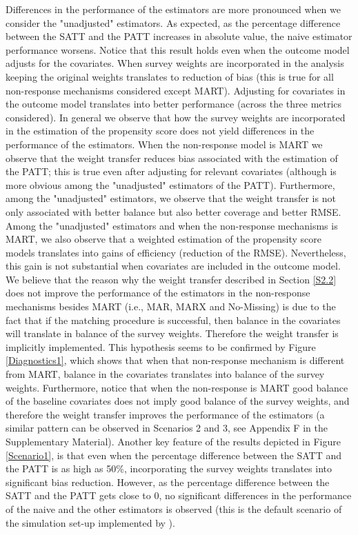 \documentclass[oupdraft]{bio}
\begin{document}
Differences in the performance of the estimators are more pronounced when we consider the "unadjusted" estimators. As expected, as the percentage difference between the SATT and the PATT increases in absolute value, the naive estimator performance worsens. Notice that this result holds even when the outcome model adjusts for the covariates. When survey weights are incorporated in the analysis keeping the original weights translates to reduction of bias (this is true for all non-response mechanisms considered except MART). Adjusting for covariates in the outcome model translates into better performance (across the three metrics considered). In general we observe that how the survey weights are incorporated in the estimation of the propensity score does not yield differences in the performance of the estimators. When the non-response model is MART we observe that the weight transfer reduces bias associated with the estimation of the PATT; this is true even after adjusting for relevant covariates (although is more obvious among the "unadjusted" estimators of the PATT). Furthermore, among the "unadjusted" estimators, we observe that the weight transfer is not only associated with better balance but also better coverage and better RMSE. Among the "unadjusted" estimators and when the non-response mechanisms is MART, we also observe that a weighted estimation of the propensity score models translates into gains of efficiency (reduction of the RMSE). Nevertheless, this gain is not substantial when covariates are included in the outcome model. We believe that the reason why the weight transfer described in Section \ref{S2.2} does not improve the performance of the estimators in the non-response mechanisms besides MART (i.e., MAR, MARX and No-Missing) is due to the fact that if the matching procedure is successful, then balance in the covariates will translate in balance of the survey weights. Therefore the weight transfer is implicitly implemented. This hypothesis seems to be confirmed by Figure \ref{Diagnostics1}, which shows that when that non-response mechanism is different from MART, balance in the covariates translates into balance of the survey weights. Furthermore, notice that when the non-response is MART good balance of the baseline covariates does not imply good balance of the survey weights, and therefore the weight transfer improves the performance of the estimators (a similar pattern can be observed in Scenarios 2 and 3, see Appendix F in the Supplementary Material). Another key feature of the results depicted in Figure \ref{Scenario1}, is that even when the percentage difference between the SATT and the PATT is as high as 50\%, incorporating the survey weights translates into significant bias reduction. However, as the percentage difference between the SATT and the PATT gets close to $0$, no significant differences in the performance of the naive and the other estimators is observed (this is the default scenario of the simulation set-up implemented by \citet{austin2016propensity}). 
\end{document}
